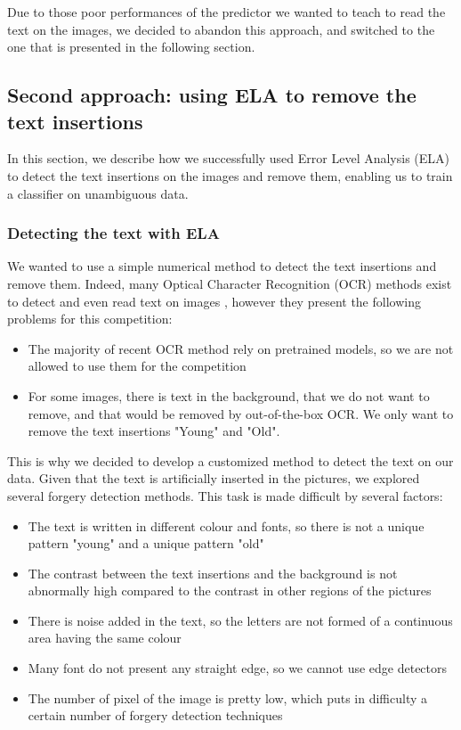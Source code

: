 \documentclass[sigconf, nonacm]{acmart}
\begin{document}
Due to those poor performances of the predictor we wanted to teach to read the text on the images, we decided to abandon this approach, and switched to the one that is presented in the following section. 

\subsection{Second approach: using ELA to remove the text insertions}

In this section, we describe how we successfully used Error Level Analysis (ELA) to detect the text insertions on the images and remove them, enabling us to train a classifier on unambiguous data.

\subsubsection{Detecting the text with ELA} \label{sec:ela_text_extraction}

We wanted to use a simple numerical method to detect the text insertions and remove them. Indeed, many Optical Character Recognition (OCR) methods exist to detect and even read text on images \cite{li_trocr_2022, lin_transferring_2022, noauthor_tesseract_2023}, however they present the following problems for this competition:

\begin{itemize}
    \item The majority of recent OCR method rely on pretrained models, so we are not allowed to use them for the competition
    \item For some images, there is text in the background, that we do not want to remove, and that would be removed by out-of-the-box OCR. We only want to remove the text insertions "Young" and "Old".
\end{itemize}

This is why we decided to develop a customized method to detect the text on our data. Given that the text is artificially inserted in the pictures, we explored several forgery detection methods. This task is made difficult by several factors:

\begin{itemize}
    \item The text is written in different colour and fonts, so there is not a unique pattern "young" and a unique pattern "old"
    \item The contrast between the text insertions and the background is not abnormally high compared to the contrast in other regions of the pictures
    \item There is noise added in the text, so the letters are not formed of a continuous area having the same colour
    \item Many font do not present any straight edge, so we cannot use edge detectors
    \item The number of pixel of the image is pretty low, which puts in difficulty a certain number of forgery detection techniques
\end{itemize}
\end{document}
